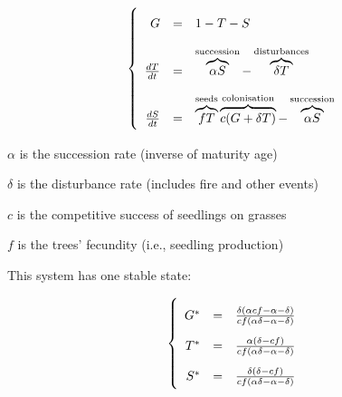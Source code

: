 \vspace{2em}

\begin{center}
\vspace{5em}
 \hspace{5em}
 \hspace{5em}
\end{center}


\vspace{1em}

\[
\left\{
\begin{array}{r c l}

G &=& 1 - T - S\\

\rule{0pt}{7ex} \frac{dT}{dt} &=& 
\overbrace{\alpha S}^\text{succession} - \overbrace{\delta T}^\text{disturbances}\\

\rule{0pt}{7ex} \frac{dS}{dt} &=& 
\overbrace{fT}^\text{seeds}
\overbrace{c(G+\delta T)}^\text{colonisation}
-
\overbrace{\alpha S}^\text{succession} \\

\end{array}
\right.
\]

\vspace{1em}

$\alpha$ is the succession rate (inverse of maturity age)

$\delta$ is the disturbance rate (includes fire and other events)

$c$ is the competitive success of seedlings on grasses

$f$ is the trees' fecundity (i.e., seedling production)


This system has one stable state:

\[
\left\{
\renewcommand{\arraystretch}{2}
\begin{array}{r c l}{}

G^\ast &=& \frac{\delta(\alpha cf-\alpha-\delta)}{cf(\alpha \delta-\alpha-\delta)}\\

T^\ast &=& \frac{\alpha(\delta-cf)}{cf(\alpha \delta-\alpha-\delta)}\\

S^\ast &=& \frac{\delta(\delta-cf)}{cf(\alpha \delta-\alpha-\delta)}\\

\end{array}
\right.
\]

